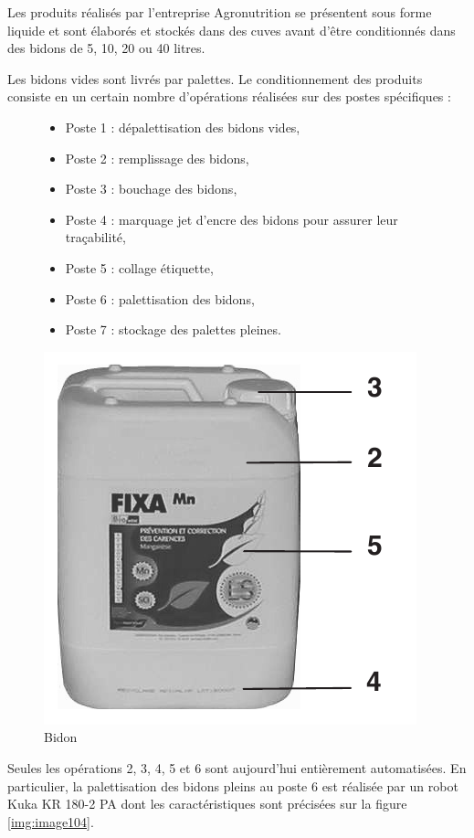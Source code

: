 Les produits réalisés par l'entreprise Agronutrition se présentent sous forme liquide et sont élaborés et stockés dans des cuves avant d'être conditionnés dans des bidons de 5, 10, 20 ou 40 litres.

Les bidons vides sont livrés par palettes. Le conditionnement des produits consiste en un certain nombre d'opérations réalisées sur des postes spécifiques :

\begin{figure}[!h]
 \begin{minipage}{0.55\linewidth}
\begin{itemize}
 \item Poste 1 : dépalettisation des bidons vides,
 \item Poste 2 : remplissage des bidons,
 \item Poste 3 : bouchage des bidons,
 \item Poste 4 : marquage jet d'encre des bidons pour assurer leur traçabilité,
 \item Poste 5 : collage étiquette,
 \item Poste 6 : palettisation des bidons,
 \item Poste 7 : stockage des palettes pleines.
\end{itemize}
 \end{minipage}
\hfill
 \begin{minipage}{0.40\linewidth}
  \centering\includegraphics[width=0.5\linewidth]{img/bidon.png}
  \caption{Bidon}
  \label{img:image101}
 \end{minipage}
\end{figure}

Seules les opérations 2, 3, 4, 5 et 6 sont aujourd'hui entièrement automatisées. En particulier, la palettisation des bidons pleins au poste 6 est réalisée par un robot Kuka KR 180-2 PA dont les caractéristiques sont précisées sur la figure \ref{img:image104}.


